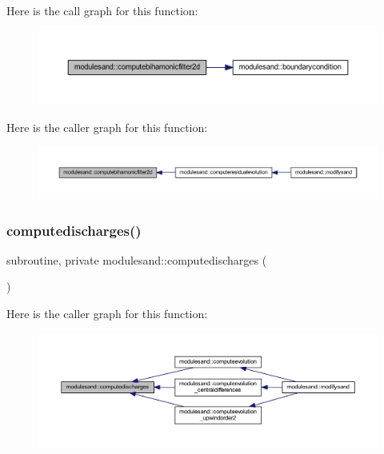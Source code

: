 Here is the call graph for this function\+:\nopagebreak
\begin{figure}[H]
\begin{center}
\leavevmode
\includegraphics[width=350pt]{namespacemodulesand_a3ea5b505a0fc6d89be163ff10c0f515e_cgraph}
\end{center}
\end{figure}
Here is the caller graph for this function\+:\nopagebreak
\begin{figure}[H]
\begin{center}
\leavevmode
\includegraphics[width=350pt]{namespacemodulesand_a3ea5b505a0fc6d89be163ff10c0f515e_icgraph}
\end{center}
\end{figure}
\mbox{\label{namespacemodulesand_a7c4449ee64c2b5e75dfe0924a2f83231}} 
\subsubsection{\texorpdfstring{computedischarges()}{computedischarges()}}
{\footnotesize\ttfamily subroutine, private modulesand\+::computedischarges (\begin{DoxyParamCaption}{ }\end{DoxyParamCaption})\hspace{0.3cm}{\ttfamily [private]}}

Here is the caller graph for this function\+:\nopagebreak
\begin{figure}[H]
\begin{center}
\leavevmode
\includegraphics[width=350pt]{namespacemodulesand_a7c4449ee64c2b5e75dfe0924a2f83231_icgraph}
\end{center}
\end{figure}
\mbox{\label{namespacemodulesand_ad15b8bd8644b2a7c104622be042c70be}} 
